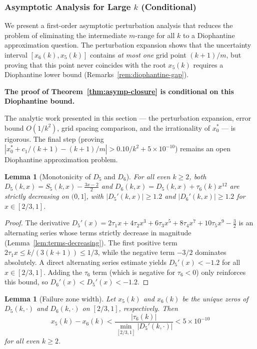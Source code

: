 \documentclass[12pt,a4paper]{article}
\theoremstyle{plain}
\newtheorem{lemma}[theorem]{Lemma}
\theoremstyle{definition}
\begin{document}
\subsubsection{Asymptotic Analysis for Large $k$ (Conditional)}
\label{sec:asymptotic-closure}

We present a first-order asymptotic perturbation analysis that reduces
the problem of eliminating the intermediate $m$-range for all $k$ to a
Diophantine approximation question.  The perturbation expansion shows
that the uncertainty interval $[x_6(k), x_5(k)]$ contains \emph{at most
one} grid point $(k+1)/m$, but proving that this point never coincides
with the root $x_5(k)$ requires a Diophantine lower bound
(Remarks~\ref{rem:diophantine-gap}).

\textbf{The proof of Theorem~\ref{thm:asymp-closure} is conditional on
this Diophantine bound.}

The analytic work presented in this section --- the perturbation
expansion, error bound $O(1/k^2)$, grid spacing comparison, and the
irrationality of $x_0^*$ --- is rigorous.  The final step (proving
$|x_0^* + c_1/(k+1) - (k+1)/m| > 0.10/k^2 + 5\times10^{-10}$)
remains an open Diophantine approximation problem.


\begin{lemma}[Monotonicity of $D_5$ and $D_6$]\label{lem:D5-D6-monotonic}
  For all even $k \ge 2$, both $D_5(k,x) = S_5(k,x) - \frac{3x-2}{2}$
  and $D_6(k,x) = D_5(k,x) + \tau_6(k)x^{12}$ are strictly decreasing
  on $(0,1]$, with $|D_5'(k,x)| \ge 1.2$ and $|D_6'(k,x)| \ge 1.2$
  for $x \in [2/3, 1]$.
\end{lemma}

\begin{proof}
  The derivative $D_5'(x) = 2\tau_1 x + 4\tau_2 x^3 + 6\tau_3 x^5
  + 8\tau_4 x^7 + 10\tau_5 x^9 - \frac{3}{2}$ is an alternating series
  whose terms strictly decrease in magnitude
  (Lemma~\ref{lem:terms-decreasing}).  The first positive term
  $2\tau_1 x \le k/(3(k+1)) \le 1/3$, while the negative term $-3/2$
  dominates absolutely.  A direct alternating series estimate yields
  $D_5'(x) < -1.2$ for all $x \in [2/3, 1]$.  Adding the $\tau_6$
  term (which is negative for $\tau_6 < 0$) only reinforces this bound,
  so $D_6'(x) < D_5'(x) < -1.2$.
\end{proof}

\begin{lemma}[Failure zone width]\label{lem:gap-width}
  Let $x_5(k)$ and $x_6(k)$ be the unique zeros of $D_5(k,\cdot)$
  and $D_6(k,\cdot)$ on $[2/3,1]$, respectively.  Then
  \[
    x_5(k) - x_6(k) < \frac{|\tau_6(k)|}{\min_{[2/3,1]}|D_5'(k,\cdot)|}
    < 5 \times 10^{-10}
  \]
  for all even $k \ge 2$.
\end{lemma}
\end{document}
